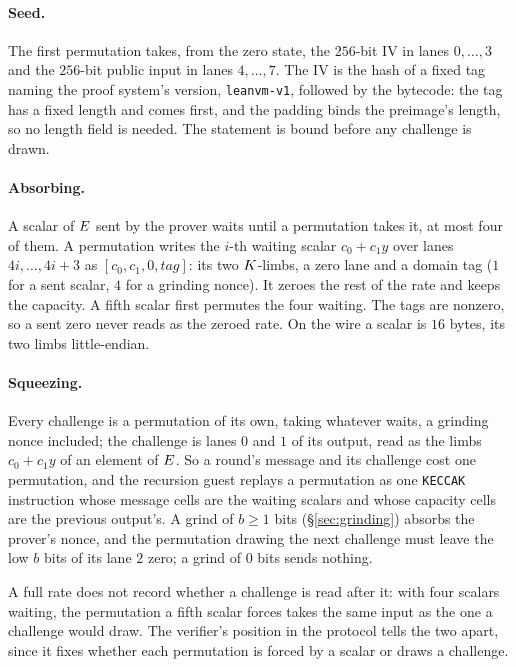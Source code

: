 \paragraph{Seed.} The first permutation takes, from the zero state, the $256$-bit IV in lanes $0,\dots,3$ and the $256$-bit public input in lanes $4,\dots,7$. The IV is the hash of a fixed tag naming the proof system's version, \texttt{leanvm-v1}, followed by the bytecode: the tag has a fixed length and comes first, and the padding binds the preimage's length, so no length field is needed. The statement is bound before any challenge is drawn.

\paragraph{Absorbing.} A scalar of $E$ sent by the prover waits until a permutation takes it, at most four of them. A permutation writes the $i$-th waiting scalar $c_0+c_1y$ over lanes $4i,\dots,4i+3$ as $[c_0,c_1,0,\mathit{tag}]$: its two $K$-limbs, a zero lane and a domain tag ($1$ for a sent scalar, $4$ for a grinding nonce). It zeroes the rest of the rate and keeps the capacity. A fifth scalar first permutes the four waiting. The tags are nonzero, so a sent zero never reads as the zeroed rate. On the wire a scalar is $16$ bytes, its two limbs little-endian.

\paragraph{Squeezing.} Every challenge is a permutation of its own, taking whatever waits, a grinding nonce included; the challenge is lanes $0$ and $1$ of its output, read as the limbs $c_0+c_1y$ of an element of $E$. So a round's message and its challenge cost one permutation, and the recursion guest replays a permutation as one \texttt{KECCAK} instruction whose message cells are the waiting scalars and whose capacity cells are the previous output's. A grind of $b\ge1$ bits (\S\ref{sec:grinding}) absorbs the prover's nonce, and the permutation drawing the next challenge must leave the low $b$ bits of its lane $2$ zero; a grind of $0$ bits sends nothing.

A full rate does not record whether a challenge is read after it: with four scalars waiting, the permutation a fifth scalar forces takes the same input as the one a challenge would draw. The verifier's position in the protocol tells the two apart, since it fixes whether each permutation is forced by a scalar or draws a challenge.

